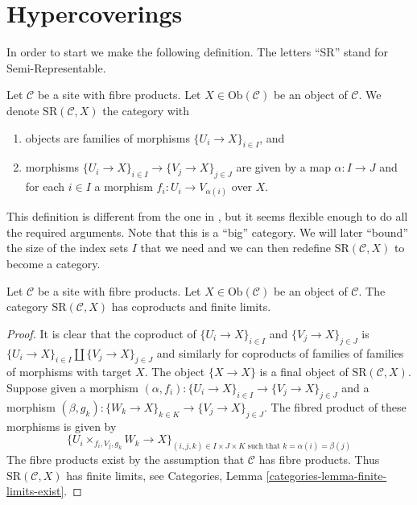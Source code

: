 \section{Hypercoverings}
\label{section-hypercoverings}

\noindent
In order to start we make the following definition.
The letters ``SR'' stand for Semi-Representable.

\begin{definition}
\label{definition-SR}
Let $\mathcal{C}$ be a site with fibre products.
Let $X \in \text{Ob}(\mathcal{C})$ be an object of $\mathcal{C}$.
We denote $\text{SR}(\mathcal{C}, X)$ the category with
\begin{enumerate}
\item objects are families of morphisms
$\{U_i \to X\}_{i \in I}$, and
\item morphisms $\{U_i \to X\}_{i \in I} \to
\{V_j \to X\}_{j \in J}$ are given by
a map $\alpha : I \to J$ and for each $i \in I$
a morphism $f_i : U_i \to V_{\alpha(i)}$ over $X$.
\end{enumerate}
\end{definition}

\noindent
This definition is different from the one in
\cite[Expose V, Sec. 7]{SGA4}, but it seems flexible
enough to do all the required arguments.
Note that this is a ``big'' category. We will later
``bound'' the size of the index sets $I$ that we need
and we can then redefine $\text{SR}(\mathcal{C}, X)$ 
to become a category.

\begin{lemma}
\label{lemma-coprod-prod-SR}
Let $\mathcal{C}$ be a site with fibre products.
Let $X \in \text{Ob}(\mathcal{C})$ be an object of $\mathcal{C}$.
The category $\text{SR}(\mathcal{C}, X)$ has
coproducts and finite limits.
\end{lemma}

\begin{proof}
It is clear that the coproduct of
$\{U_i \to X\}_{i \in I}$ and $\{V_j \to X\}_{j \in J}$
is $\{U_i \to X\}_{i \in I} \coprod \{V_j \to X\}_{j \in J}$
and similarly for coproducts of
families of families of morphisms with target $X$.
The object $\{X \to X\}$ is a final
object of $\text{SR}(\mathcal{C}, X)$.
Suppose given a morphism
$(\alpha, f_i) : \{U_i \to X\}_{i \in I} \to \{V_j \to X\}_{j \in J}$
and a morphism
$(\beta, g_k) : \{W_k \to X\}_{k \in K} \to \{V_j \to X\}_{j \in J}$.
The fibred product of these morphisms is given by
$$
\{ U_i \times_{f_i, V_j, g_k} W_k \to X \}_{(i,j,k) \in I\times J\times K
\text{ such that } k = \alpha(i) = \beta(j)}
$$
The fibre products exist by the assumption that
$\mathcal{C}$ has fibre products.
Thus $\text{SR}(\mathcal{C}, X)$ has finite limits,
see Categories, Lemma \ref{categories-lemma-finite-limits-exist}.
\end{proof}

